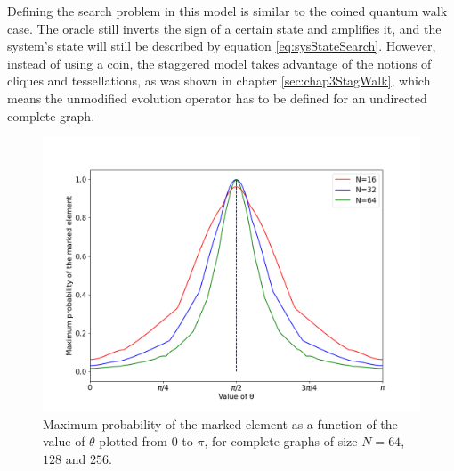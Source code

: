 \documentclass[../../dissertation.tex]{subfiles}
\begin{document}
Defining the search problem in this model is similar to the coined quantum walk
case. The oracle still inverts the sign of a certain state and amplifies it,
and the system's state will still be described by equation
\eqref{eq:sysStateSearch}. However, instead of using a coin, the staggered
model takes advantage of the notions of cliques and tessellations, as was shown
in chapter \ref{sec:chap3StagWalk}, which means the unmodified evolution
operator has to be defined for an undirected complete graph.
\begin{figure}[!h]
	\centering
	\includegraphics[scale=0.40]{img/StagQuantumWalk/Search/Theta163264.png}
	\caption{Maximum probability of the marked element as a function of the value of $\theta$ plotted from $0$ to $\pi$, for complete graphs of size $N=64$, $128$ and $256$.} 
	\label{fig:stagMultTheta}
\end{figure}\par
\end{document}
